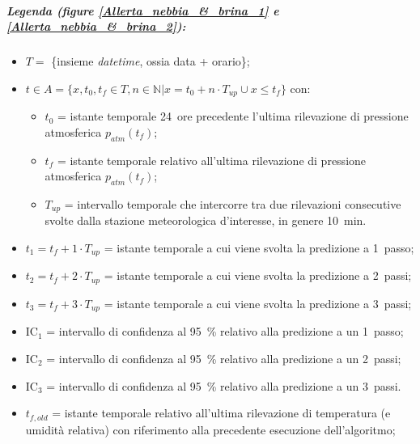 \subparagraph{Legenda (figure \ref{Allerta_nebbia_&_brina_1} e \ref{Allerta_nebbia_&_brina_2}):}
\begin{itemize}
	\item $T = $ \{insieme \textit{datetime}, ossia data + orario\};
	\item $t \in A = \{x, t_0, t_f \in T, n \in \mathbb{N}| x = t_0 + n \cdot T_{up} \cup x \leq t_f\}$ con:
	\begin{itemize}
		\item $t_0$ = istante temporale 24~ore precedente l'ultima rilevazione di pressione atmosferica $p_{atm}(t_f)$;
		\item $t_f$ = istante temporale relativo all'ultima rilevazione di pressione atmosferica $p_{atm}(t_f)$;   
		\item $T_{up}$ = intervallo temporale che intercorre tra due rilevazioni consecutive svolte dalla stazione meteorologica d'interesse, in genere \SI{10}{\minute}.  
	\end{itemize}
	\item $t_1 = t_f + 1 \cdot T_{up}$ = istante temporale a cui viene svolta la predizione a 1~passo; 
	\item $t_2 = t_f + 2 \cdot T_{up}$ = istante temporale a cui viene svolta la predizione a 2~passi;
	\item $t_3 = t_f + 3 \cdot T_{up}$ = istante temporale a cui viene svolta la predizione a 3~passi;
	\item IC$_{1}$ = intervallo di confidenza al \SI{95}{\percent} relativo alla predizione a un 1~passo;
	\item IC$_{2}$ = intervallo di confidenza al \SI{95}{\percent} relativo alla predizione a un 2~passi;
	\item IC$_{3}$ = intervallo di confidenza al \SI{95}{\percent} relativo alla predizione a un 3~passi.
	\item $t_{f, old}$ = istante temporale relativo all'ultima rilevazione di temperatura (e umidità relativa) con riferimento alla precedente esecuzione dell'algoritmo;
\end{itemize}


